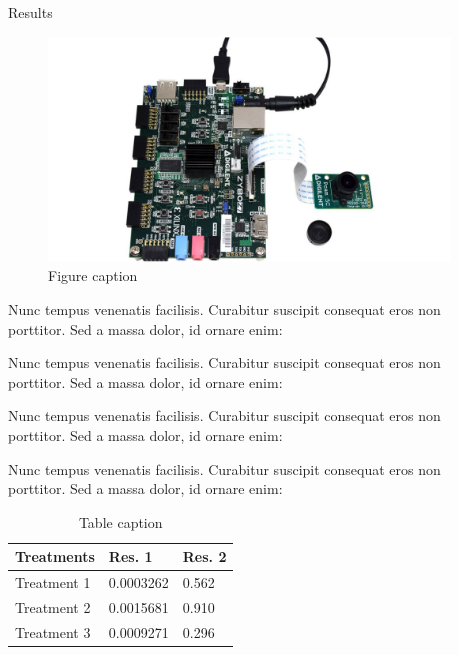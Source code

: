 \documentclass[final]{beamer}
\newlength{\onecolwid}
\newlength{\twocolwid}
\begin{document}
\begin{frame}[t]
\begin{columns}[t]
\begin{column}{\twocolwid}
\begin{columns}[t,totalwidth=\twocolwid]
\begin{column}{\onecolwid}

\end{column} %

\begin{column}{\onecolwid} %


\begin{block}{Results}

\begin{figure}
\includegraphics[width=0.8\linewidth]{../figures/placeholder.jpg}
\caption{Figure caption}
\end{figure}

Nunc tempus venenatis facilisis. Curabitur suscipit consequat eros non porttitor. Sed a massa dolor, id ornare enim:

Nunc tempus venenatis facilisis. Curabitur suscipit consequat eros non porttitor. Sed a massa dolor, id ornare enim:

Nunc tempus venenatis facilisis. Curabitur suscipit consequat eros non porttitor. Sed a massa dolor, id ornare enim:

Nunc tempus venenatis facilisis. Curabitur suscipit consequat eros non porttitor. Sed a massa dolor, id ornare enim:

\begin{table}
\vspace{2ex}
\begin{tabular}{l l l}
\toprule
\textbf{Treatments} & \textbf{Res. 1} & \textbf{Res. 2}\\
\midrule
Treatment 1 & 0.0003262 & 0.562 \\
Treatment 2 & 0.0015681 & 0.910 \\
Treatment 3 & 0.0009271 & 0.296 \\
\bottomrule
\end{tabular}
\caption{Table caption}
\end{table}


\end{block}
\end{column}
\end{columns}
\end{column}
\end{columns}
\end{frame}
\end{document}
